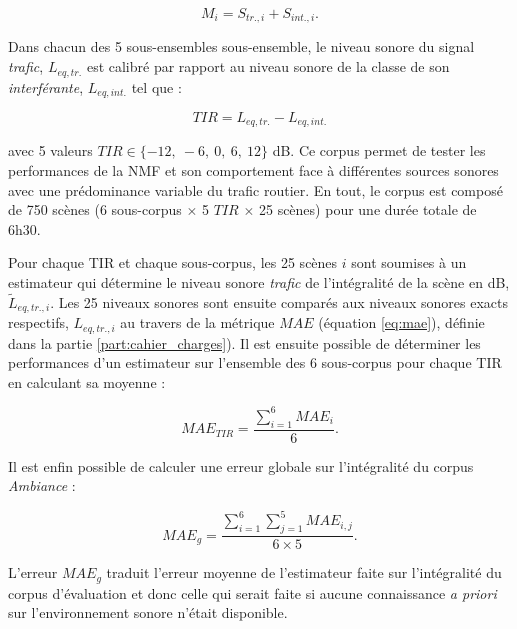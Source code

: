 \begin{equation}
M_i = S_{tr.,i}+S_{int.,i}.
\end{equation}

Dans chacun des 5 sous-ensembles sous-ensemble, le niveau sonore du signal \textit{trafic}, $L_{eq,tr.}$ est calibré par rapport au niveau sonore de la classe de son \textit{interférante}, $L_{eq,int.}$ tel que : 

\begin{equation}
TIR = L_{eq,tr.} - L_{eq,int.}
\end{equation}

avec 5 valeurs $TIR \in \lbrace -12,~-6,~0,~6,~12 \rbrace$ dB. Ce corpus permet de tester les performances de la NMF et son comportement face à différentes sources sonores avec une prédominance variable du trafic routier. En tout, le corpus est composé de 750 scènes (6 sous-corpus $\times$ 5 $TIR$ $\times$ 25 scènes) pour une durée totale de 6h30.

Pour chaque TIR et chaque sous-corpus, les 25 scènes $i$ sont soumises à un estimateur qui détermine le niveau sonore \textit{trafic} de l'intégralité de la scène en dB,  $\tilde{L}_{eq,tr., i}$. Les 25 niveaux sonores sont ensuite comparés aux niveaux sonores exacts respectifs, $L_{eq,tr., i}$ au travers de la métrique $MAE$ (équation \ref{eq:mae}), définie dans la partie \ref{part:cahier_charges}). Il est ensuite possible de déterminer les performances d'un estimateur sur l'ensemble des 6 sous-corpus pour chaque TIR en calculant sa moyenne :

\begin{equation}\label{eq:mae_tir}
MAE_{TIR} = \frac{\sum_{i = 1}^6 MAE_{i}}{6}.
\end{equation}

Il est enfin possible de calculer une erreur globale sur l'intégralité du corpus \textit{Ambiance}  : 

\begin{equation}\label{eq:mae_g}
MAE_{g} = \frac{\sum_{i = 1}^6 \sum_{j = 1}^5 MAE_{i,j}}{6 \times 5}.
\end{equation}

L'erreur $MAE_g$ traduit l'erreur moyenne de l'estimateur faite sur l'intégralité du corpus d'évaluation et donc celle qui serait faite si aucune connaissance \textit{a priori} sur l'environnement sonore n'était disponible.

